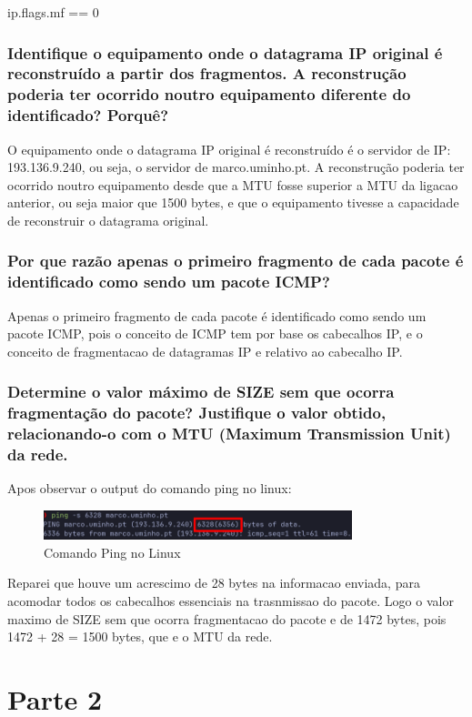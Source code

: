 \documentclass{article}
\begin{document}
ip.flags.mf == 0

\subsubsection{Identifique o equipamento onde o datagrama IP original é reconstruído a
partir dos fragmentos. A reconstrução poderia ter ocorrido noutro
equipamento diferente do identificado? Porquê?}

O equipamento onde o datagrama IP original é reconstruído é o servidor de IP: 193.136.9.240, ou seja, o servidor de marco.uminho.pt. A reconstrução poderia ter ocorrido noutro equipamento desde que a MTU fosse superior a MTU da ligacao anterior, ou seja maior que 1500 bytes, e que o equipamento tivesse a capacidade de reconstruir o datagrama original.

\subsubsection{Por que razão apenas o primeiro fragmento de cada pacote é identificado
como sendo um pacote ICMP?}

Apenas o primeiro fragmento de cada pacote é identificado como sendo um pacote ICMP, pois o conceito de ICMP tem por base os cabecalhos IP, e o conceito de fragmentacao de datagramas IP e relativo ao cabecalho IP.

\subsubsection{Determine o valor máximo de SIZE sem que ocorra
fragmentação do pacote? Justifique o valor obtido, relacionando-o com o
MTU (Maximum Transmission Unit) da rede.}

Apos observar o output do comando ping no linux:
\begin{figure}[h]
    \centering
    \includegraphics[width=0.8\textwidth]{images/ping_cmd.png}
    \caption{\label{fig:ping_cmd}Comando Ping no Linux}
\end{figure}
Reparei que houve um acrescimo de 28 bytes na informacao enviada, para acomodar todos os cabecalhos essenciais na trasnmissao do pacote.
Logo o valor maximo de SIZE sem que ocorra fragmentacao do pacote e de 1472 bytes, pois 1472 + 28 = 1500 bytes, que e o MTU da rede.

\section{Parte 2}
\end{document}
